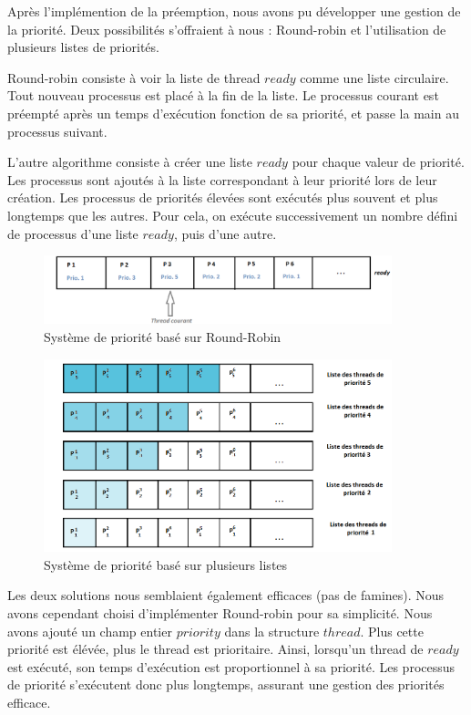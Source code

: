 Après l'implémention de la préemption, nous avons pu développer une gestion de la priorité. Deux possibilités s'offraient à nous : Round-robin et l'utilisation de plusieurs listes de priorités.

Round-robin consiste à voir la liste de thread $ready$ comme une liste circulaire. Tout nouveau processus est placé à la fin de la liste. Le processus courant est préempté après un temps d'exécution fonction de sa priorité, et passe la main au processus suivant.

L'autre algorithme consiste à créer une liste $ready$ pour chaque valeur de priorité. Les processus sont ajoutés à la liste correspondant à leur priorité lors de leur création. Les processus de priorités élevées sont exécutés plus souvent et plus longtemps que les autres. Pour cela, on exécute successivement un nombre défini de processus d'une liste $ready$, puis d'une autre.

\begin{figure}[!h]
\centering
\includegraphics[width=0.9\textwidth]{round_robin.png}
\caption{Système de priorité basé sur Round-Robin}  
\label{sequence} 
\end{figure} 

\begin{figure}[!h]
\centering
\includegraphics[width=0.9\textwidth]{queus_multi.png}
\caption{Système de priorité basé sur plusieurs listes}  
\label{sequence} 
\end{figure} 


Les deux solutions nous semblaient également efficaces (pas de famines). Nous avons cependant choisi d'implémenter Round-robin pour sa simplicité. Nous avons ajouté un champ entier $priority$ dans la structure $thread$. Plus cette priorité est élévée, plus le thread est prioritaire. Ainsi, lorsqu'un thread de $ready$ est exécuté, son temps d'exécution est proportionnel à sa priorité. Les processus de priorité s'exécutent donc plus longtemps, assurant une gestion des priorités efficace.